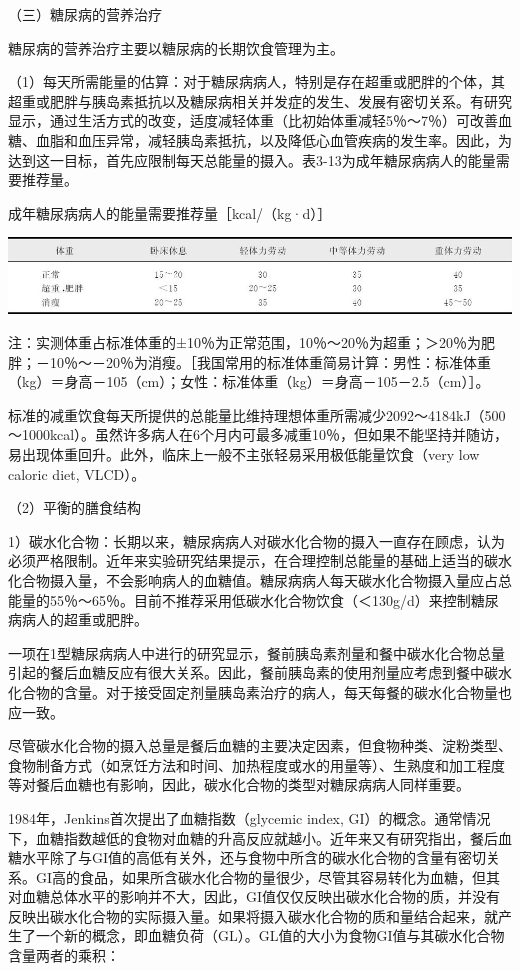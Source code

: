 （三）糖尿病的营养治疗

糖尿病的营养治疗主要以糖尿病的长期饮食管理为主。

（1）每天所需能量的估算：对于糖尿病病人，特别是存在超重或肥胖的个体，其超重或肥胖与胰岛素抵抗以及糖尿病相关并发症的发生、发展有密切关系。有研究显示，通过生活方式的改变，适度减轻体重（比初始体重减轻5％～7％）可改善血糖、血脂和血压异常，减轻胰岛素抵抗，以及降低心血管疾病的发生率。因此，为达到这一目标，首先应限制每天总能量的摄入。表3-13为成年糖尿病病人的能量需要推荐量。

\begin{table}[htbp]
\centering
\caption{成年糖尿病病人的能量需要推荐量［kcal/（kg·d）］}
\label{tab3-13}
\includegraphics{./images/Image00029.jpg}
\end{table}

注：实测体重占标准体重的±10％为正常范围，10％～20％为超重；＞20％为肥胖；－10％～－20％为消瘦。［我国常用的标准体重简易计算：男性：标准体重（kg）＝身高－105（cm）；女性：标准体重（kg）＝身高－105－2.5（cm）］。

标准的减重饮食每天所提供的总能量比维持理想体重所需减少2092～4184kJ（500～1000kcal）。虽然许多病人在6个月内可最多减重10％，但如果不能坚持并随访，易出现体重回升。此外，临床上一般不主张轻易采用极低能量饮食（very
low caloric diet, VLCD）。

（2）平衡的膳食结构

1）碳水化合物：长期以来，糖尿病病人对碳水化合物的摄入一直存在顾虑，认为必须严格限制。近年来实验研究结果提示，在合理控制总能量的基础上适当的碳水化合物摄入量，不会影响病人的血糖值。糖尿病病人每天碳水化合物摄入量应占总能量的55％～65％。目前不推荐采用低碳水化合物饮食（＜130g/d）来控制糖尿病病人的超重或肥胖。

一项在1型糖尿病病人中进行的研究显示，餐前胰岛素剂量和餐中碳水化合物总量引起的餐后血糖反应有很大关系。因此，餐前胰岛素的使用剂量应考虑到餐中碳水化合物的含量。对于接受固定剂量胰岛素治疗的病人，每天每餐的碳水化合物量也应一致。

尽管碳水化合物的摄入总量是餐后血糖的主要决定因素，但食物种类、淀粉类型、食物制备方式（如烹饪方法和时间、加热程度或水的用量等）、生熟度和加工程度等对餐后血糖也有影响，因此，碳水化合物的类型对糖尿病病人同样重要。

1984年，Jenkins首次提出了血糖指数（glycemic index,
GI）的概念。通常情况下，血糖指数越低的食物对血糖的升高反应就越小。近年来又有研究指出，餐后血糖水平除了与GI值的高低有关外，还与食物中所含的碳水化合物的含量有密切关系。GI高的食品，如果所含碳水化合物的量很少，尽管其容易转化为血糖，但其对血糖总体水平的影响并不大，因此，GI值仅仅反映出碳水化合物的质，并没有反映出碳水化合物的实际摄入量。如果将摄入碳水化合物的质和量结合起来，就产生了一个新的概念，即血糖负荷（GL）。GL值的大小为食物GI值与其碳水化合物含量两者的乘积：


